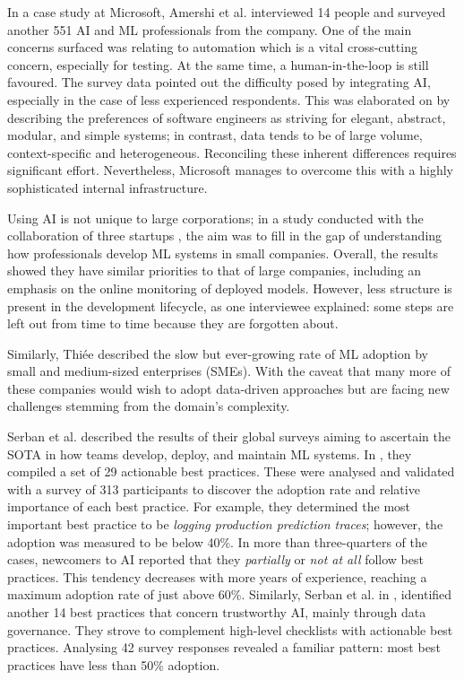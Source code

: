 In a case study at Microsoft, Amershi et al. \cite{amershi2019software} interviewed 14 people and surveyed another 551 AI and ML professionals from the company. One of the main concerns surfaced was relating to automation which is a vital cross-cutting concern, especially for testing. At the same time, a human-in-the-loop is still favoured. The survey data pointed out the difficulty posed by integrating AI, especially in the case of less experienced respondents. This was elaborated on by describing the preferences of software engineers as striving for elegant, abstract, modular, and simple systems; in contrast, data tends to be of large volume, context-specific and heterogeneous. Reconciling these inherent differences requires significant effort. Nevertheless, Microsoft manages to overcome this with a highly sophisticated internal infrastructure.

Using AI is not unique to large corporations; in a study conducted with the collaboration of three startups \cite{de2019understanding}, the aim was to fill in the gap of understanding how professionals develop ML systems in small companies. Overall, the results showed they have similar priorities to that of large companies, including an emphasis on the online monitoring of deployed models. However, less structure is present in the development lifecycle, as one interviewee explained: some steps are left out from time to time because they are forgotten about.

Similarly, Thiée \cite{thiee2021systematic} described the slow but ever-growing rate of ML adoption by small and medium-sized enterprises (SMEs). With the caveat that many more of these companies would wish to adopt data-driven approaches but are facing new challenges stemming from the domain's complexity.

Serban et al. \cite{serban2020adoption,serban2021practices} described the results of their global surveys aiming to ascertain the SOTA in how teams develop, deploy, and maintain ML systems. In \cite{serban2020adoption}, they compiled a set of 29 actionable best practices. These were analysed and validated with a survey of 313 participants to discover the adoption rate and relative importance of each best practice. For example, they determined the most important best practice to be \textit{logging production prediction traces}; however, the adoption was measured to be below 40\%. In more than three-quarters of the cases, newcomers to AI reported that they \textit{partially} or \textit{not at all} follow best practices. This tendency decreases with more years of experience, reaching a maximum adoption rate of just above 60\%. Similarly, Serban et al. in \cite{serban2021practices}, identified another 14 best practices that concern trustworthy AI, mainly through data governance. They strove to complement high-level checklists with actionable best practices. Analysing 42 survey responses revealed a familiar pattern: most best practices have less than 50\% adoption.

